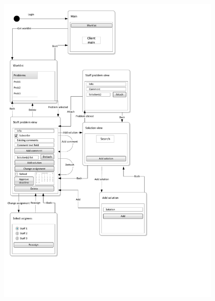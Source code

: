 \begin{figure}[H]
	\centering
		\includegraphics[width = \textwidth, clip=true, trim=0 4cm 5cm 0]{input/application_domain_analysis/Navigation_DiagramStaff.pdf}
	\morscaption{\sinterface[c]}
	\label{fig:staff_interface} %
\end{figure}



